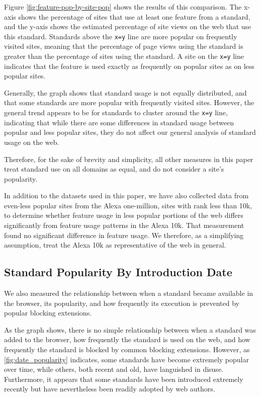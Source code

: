 Figure \ref{fig:feature-pop-by-site-pop} shows the results of this comparison.
The x-axis shows the percentage of sites that use at least one feature from a
standard, and the y-axis shows the estimated percentage of site views on the
web that use this standard.  Standards above the \texttt{x=y} line are more
popular on frequently visited sites, meaning that the percentage of page views
using the standard is greater than the percentage of sites using the standard.
A site on the \texttt{x=y} line indicates that the feature is used exactly as
frequently on popular sites as on less popular sites.

Generally, the graph shows that standard usage is not equally distributed, and
that some standards are more popular with frequently visited sites.  However,
the general trend appears to be for standards to cluster around the
\texttt{x=y} line, indicating that while there are some differences in standard
usage between popular and less popular sites, they do not affect our general
analysis of standard usage on the web.

Therefore, for the sake of brevity and simplicity, all other measures in this
paper treat standard use on all domains as equal, and do not consider a site's
popularity.

In addition to the datasets used in this paper, we have also collected data
from even-less popular sites from the Alexa one-million, sites with rank less
than 10k, to determine whether feature usage in less popular portions of the
web differs significantly from feature usage patterns in the Alexa 10k.  That
measurement found no significant difference in feature usage.  We therefore, as
a simplifying assumption, treat the Alexa 10k as representative of the web in
general.


\subsection{Standard Popularity By Introduction Date}


We also measured the relationship between when a standard became available in
the browser, its popularity, and how frequently its execution is prevented by
popular blocking extensions.

As the graph shows, there is no simple relationship between when a standard was
added to the browser, how frequently the standard is used on the web, and how
frequently the standard is blocked by common blocking extensions.  However, as
\ref{fig:date_popularity} indicates, some standards have become extremely
popular over time, while others, both recent and old, have languished in
disuse. Furthermore, it appears that some standards have been introduced
extremely recently but have nevertheless been readily adopted by web authors.

